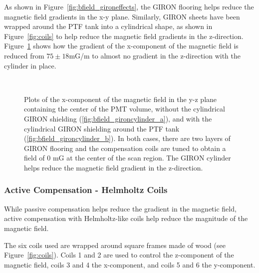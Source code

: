 As shown in Figure~\ref{fig:bfield_gironeffects}, the GIRON flooring helps reduce the magnetic field gradients in the x-y plane. Similarly, GIRON sheets have been wrapped around the PTF tank into a cylindrical shape, as shown in Figure~\ref{fig:coils} to help reduce the magnetic field gradients in the z-direction. Figure~\ref{fig:bfield_gironcylinder} shows how the gradient of the x-component of the magnetic field is reduced from $ 75\pm18 $mG/m to almost no gradient in the z-direction with the cylinder in place.
%
\begin{figure}[htbp]
  \begin{center}
    \\
    \vspace{-3 mm}
  \caption{Plots of the x-component of the magnetic field in the y-z plane containing the center of the PMT volume, without the cylindrical GIRON shielding (\ref{fig:bfield_gironcylinder_a}), and with the cylindrical GIRON shielding around the PTF tank (\ref{fig:bfield_gironcylinder_b}). In both cases, there are two layers of GIRON flooring and the compensation coils are tuned to obtain a field of 0 mG at the center of the scan region. The GIRON cylinder helps reduce the magnetic field gradient in the z-direction.}
  \label{fig:bfield_gironcylinder}
  \end{center}
\end{figure}
%

\subsubsection{Active Compensation - Helmholtz Coils}

While passive compensation helps reduce the gradient in the magnetic field, active compensation with Helmholtz-like coils help reduce the magnitude of the magnetic field.

The six coils used are wrapped around square frames made of wood (see Figure~\ref{fig:coils}). Coils 1 and 2 are used to control the z-component of the magnetic field, coils 3 and 4 the x-component, and coils 5 and 6 the y-component.

